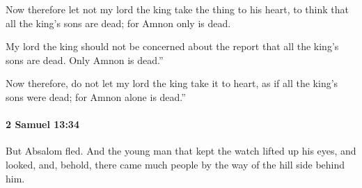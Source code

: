 			\begin{versebox}
					\item[BHS] 
					\item[ASV] Now therefore let not my lord the king take the thing to his heart, to think that all the king's sons are dead; for Amnon only is dead.
					\item[NIV] My lord the king should not be concerned about the report that all the king’s sons are dead. Only Amnon is dead.”
					\item[NRSV] Now therefore, do not let my lord the king take it to heart, as if all the king’s sons were dead; for Amnon alone is dead.”
			\end{versebox}

		\paragraph{2 Samuel 13:34} %
			\label{2SAMUEL-13-34}

			But Absalom fled. And the young man that kept the watch lifted up his eyes, and looked, and, behold, there came much people by the way of the hill side behind him.

